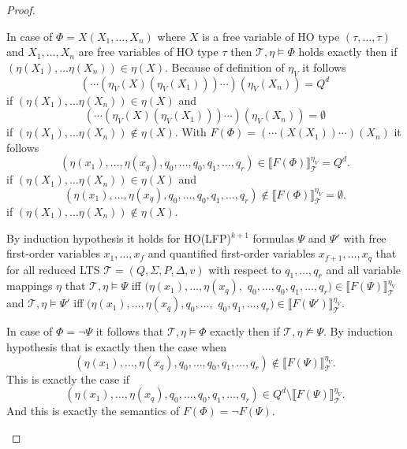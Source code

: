\begin{proof}
\begin{compactitem}
        \item In case of $\Phi = X(X_1, \dots, X_n)$ where $X$ is a free variable of HO type $(\tau, \dots,
        \tau)$ and $X_1, \dots, X_n$ are free variables of HO type $\tau$ then $\mathcal{T}, \eta \models \Phi$
        holds exactly then if $(\eta(X_1), \dots \eta(X_n)) \in \eta(X)$. Because of definition of $\eta_V$ it follows
        \[(\dotsb(\eta_V(X)(\eta_V(X_1)))\dotsb)(\eta_V(X_n)) = Q^d\]
        if $(\eta(X_1), \dots \eta(X_n)) \in \eta(X)$ and
        \[(\dotsb(\eta_V(X)(\eta_V(X_1)))\dotsb)(\eta_V(X_n)) = \emptyset\]
        if $(\eta(X_1), \dots \eta(X_n)) \not\in \eta(X)$. With $F(\Phi) = (\dotsb (X(X_1))\dotsb)(X_n)$
        it follows
        \[ (\eta(x_1), \dots, \eta(x_q), q_0, \dots, q_0, q_1, \dots, q_r) \in \llbracket F(\Phi) \rrbracket^{\eta_V}_\mathcal{T} = Q^d.\]
        if $(\eta(X_1), \dots \eta(X_n))\in \eta(X)$ and
        \[ (\eta(x_1), \dots, \eta(x_q), q_0, \dots, q_0, q_1, \dots, q_r) \not\in \llbracket F(\Phi)
        \rrbracket^{\eta_V}_\mathcal{T} = \emptyset.\]
        if $(\eta(X_1), \dots \eta(X_n)) \not\in \eta(X)$.
    \end{compactitem}
    By induction hypothesis it holds for HO(LFP)$^{k+1}$ formulas $\Psi$ and $\Psi'$ with free first-order variables $x_1, \dots,
    x_f$ and quantified first-order variables $x_{f+1}, \dots, x_q$ that for all reduced LTS $\mathcal{T} = (Q, \Sigma, P, \Delta, v)$ with respect to $q_1, \dots, q_r$ and all variable
    mappings $\eta$ that $\mathcal{T}, \eta \models \Psi$ iff $ (\eta(x_1), \dots, \eta(x_q),$ $ q_0, \dots, q_0, q_1, \dots, q_r) \in
    \llbracket F(\Psi) \rrbracket^{\eta_V}_\mathcal{T}$ and $\mathcal{T}, \eta \models \Psi'$ iff $
    (\eta(x_1), \dots, \eta(x_q), q_0, \dots, $ $q_0, q_1, \dots, q_r) \in \llbracket F(\Psi')\rrbracket^{\eta_V
    }_\mathcal{T}$.
    \begin{compactitem}
        \item In case of $\Phi = \neg \Psi$ it follows that $\mathcal{T}, \eta \models \Phi$ exactly then if
        $\mathcal{T}, \eta \not\models \Psi$. By induction hypothesis that is exactly then the case when
        \[ (\eta(x_1), \dots, \eta(x_q), q_0, \dots, q_0, q_1, \dots, q_r) \not\in \llbracket F(\Psi) \rrbracket^{\eta_V}_\mathcal{T}.\]
        This is exactly the case if
        \[ (\eta(x_1), \dots, \eta(x_q), q_0, \dots, q_0, q_1, \dots, q_r) \in Q^d \setminus \llbracket F(\Psi) \rrbracket^{\eta_V}_\mathcal{T}.\]
        And this is exactly the semantics of $F(\Phi) = \neg F(\Psi)$.


\end{compactitem}
\end{proof}

